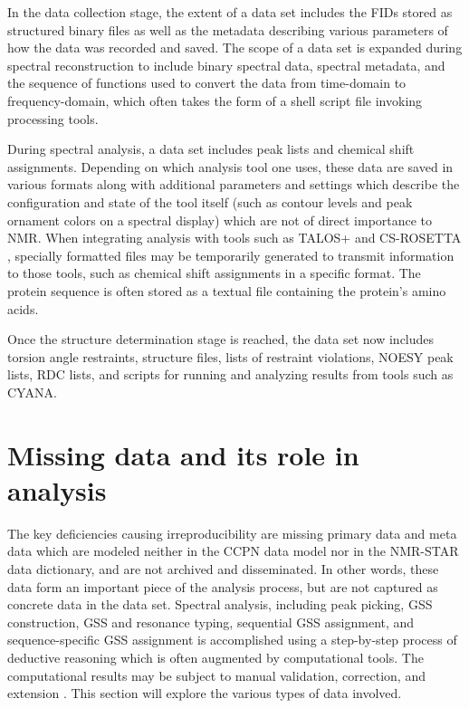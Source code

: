 In the data collection stage, the extent of a data set includes the FIDs
stored as structured binary files as well as the metadata describing
various parameters of how the data was recorded and saved.  The scope of
a data set is expanded during spectral reconstruction to include binary
spectral data, spectral metadata, and the sequence of functions used to
convert the data from time-domain to frequency-domain, which often takes
the form of a shell script file invoking processing tools.

During spectral analysis, a data set includes peak lists and chemical shift
assignments.  Depending on which analysis tool one uses, these data are saved
in various formats along with additional parameters and settings which 
describe the configuration and state of the tool itself (such as contour
levels and peak ornament colors on a spectral display) which are not of direct
importance to NMR.  When integrating analysis with tools such as TALOS+ and
CS-ROSETTA \cite{talos+, cs-rosetta}, specially formatted files may be 
temporarily generated to transmit information to those tools, such as 
chemical shift assignments in a specific format.  The protein sequence is
often stored as a textual file containing the protein's amino acids.

Once the structure determination stage is reached, the data set now includes
torsion angle restraints, structure files, lists of restraint violations, 
NOESY peak lists, RDC lists, and scripts for running and analyzing results 
from tools such as CYANA.



\section{Missing data and its role in analysis}
The key deficiencies causing irreproducibility are missing primary data and 
meta data which are modeled neither in the CCPN data model nor in the 
NMR-STAR data dictionary, and are not archived and disseminated.
In other words, these data form an important piece of the analysis process,
but are not captured as concrete data in the data set.
Spectral analysis, including peak picking, GSS construction, GSS and resonance
typing, sequential GSS assignment, and sequence-specific GSS assignment is 
accomplished using a step-by-step process of deductive reasoning 
which is often augmented by computational tools.  The computational 
results may be subject to manual validation, correction, and extension
\cite{guerry2011automated}.  This section will explore the various types
of data involved.


